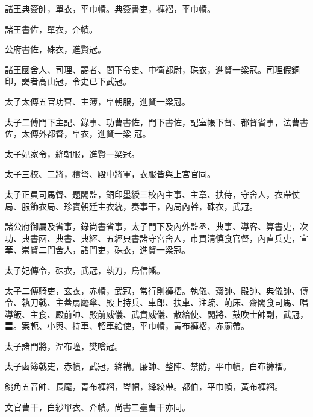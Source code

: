 \begin{pinyinscope}
 諸王典簽帥，單衣，平巾幘。典簽書吏，褲褶，平巾幘。



 諸王書佐，單衣，介幘。



 公府書佐，硃衣，進賢冠。



 諸王國舍人、司理、謁者、閤下令史、中衛都尉，硃衣，進賢一梁冠。司理假銅印，謁者高山冠，令史已下武冠。



 太子太傅五官功曹、主簿，皁朝服，進賢一梁冠。



 太子二傅門下主記、錄事、功曹書佐，門下書佐，記室帳下督、都督省事，法曹書佐，太傅外都督，皁衣，進賢一梁
 冠。



 太子妃家令，絳朝服，進賢一梁冠。



 太子三校、二將，積弩、殿中將軍，衣服皆與上宮官同。



 太子正員司馬督、題閣監，銅印墨綬三校內主事、主章、扶侍，守舍人，衣帶仗局、服飾衣局、珍寶朝廷主衣統，奏事干，內局內幹，硃衣，武冠。



 諸公府御屬及省事，錄尚書省事，太子門下及內外監丞、典事、導客、算書吏，次功、典書函、典書、典經、五經典書諸守宮舍人，市買清慎食官督，內直兵吏，宣華、崇賢二門舍人，諸門吏，硃衣，進賢一梁冠。



 太子妃傳令，硃衣，武冠，執刀，烏信幡。



 太子二傅騎吏，玄衣，赤幘，武冠，常行則褲褶。執儀、齋帥、殿帥、典儀帥、傳令、執刀戟、主蓋扇麾傘、殿上持兵、車郎、扶車、注疏、萌床、齋閣食司馬、唱導飯、主食、殿前帥、殿前威儀、武賁威儀、散給使、閣將、鼓吹士帥副，武冠，〓。案軛、小輿、持車、軺車給使，平巾幘，黃布褲褶，赤罽帶。



 太子諸門將，涅布曈，樊噲冠。



 太子鹵簿戟吏，赤幘，武冠，絳褠。廉帥、整陣、禁防，平巾幘，白布褲褶。



 銚角五音帥、長麾，青布褲褶，岑帽，絳絞帶。都伯，平巾幘，黃布褲褶。



 文官曹干，白紗單衣、介幘。尚書二臺曹干亦同。




\end{pinyinscope}
